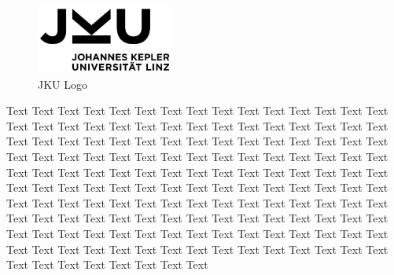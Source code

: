
\begin{figure}
    \captionsetup{type=figure}
    \includegraphics[width=4.5cm]{Pictures/JKU-Logo.jpg}
    \caption{JKU Logo}\label{fig:Wrapfig}
\end{figure}
Text Text Text Text Text Text Text Text Text Text Text Text Text Text Text Text Text Text Text Text Text Text Text Text Text Text Text Text Text Text Text Text Text Text Text Text Text Text Text Text Text Text Text Text Text Text Text Text Text Text Text Text Text Text Text Text Text Text Text Text Text Text Text Text Text Text Text Text Text Text Text Text Text Text Text Text Text Text Text Text Text Text Text Text Text Text Text Text Text Text Text Text Text Text Text Text Text Text Text Text Text Text Text Text Text Text Text Text Text Text Text Text Text Text Text Text Text Text Text Text Text Text Text Text Text Text Text Text Text Text Text Text Text Text Text Text Text Text Text Text Text Text Text Text Text Text Text Text Text Text Text Text Text Text Text Text Text Text